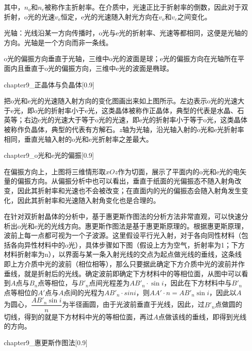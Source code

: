 其中，$n_o$和$n_e$被称作主折射率。在介质中，光速正比于折射率的倒数，因此对于双折射，o光的光速$v_o$恒定，e光的光速随入射光方向在$v_o$和$v_e$之间变化。
\begin{law}[光轴、o光与e光的偏振方向]
    光轴：光线沿某一方向传播时，o光与e光的折射率、光速等都相同，这便是光轴的方向。光轴是一个方向而非一条线。

    o光的偏振方向垂直于光轴，三维中o光的波面是球；e光的偏振方向在光轴所在平面内且垂直于o光的偏振方向，三维中e光的波面是椭球。
\end{law}
\begin{singlefigure}[正晶体与负晶体]{chapter9_正晶体与负晶体}[0.9]
\end{singlefigure}

把o光和e光的光速随入射方向的变化图画出来如上图所示。左边表示o光的光速大于e光，即o光的折射率小于e光，这类晶体被称作正晶体，典型的代表是水晶、石英等；右边e光的光速大于等于o光的光速，即e光的折射率小于等于o光，这类晶体被称作负晶体，典型的代表有方解石。$z$轴为光轴，沿光轴入射的o光和e光折射率相同，垂直光轴入射的o光和e光折射率之差最大。

\begin{singlefigure}[o光和e光的偏振]{chapter9_o光和e光的偏振}[0.9]
\end{singlefigure}

在偏振方向上，上图将三维情形取$xOz$作为切面，展示了平面内的o光和e光的电矢量的偏振方向。从偏振分析中也可以看出，垂直于纸面的光偏振态不随入射角改变，因此其折射率和光速也不会被改变；在直面内的光的偏振态会随入射角发生变化，因此其折射率和光速随入射角变化也是合理的。

在针对双折射晶体的分析中，基于惠更斯作图法的分析方法非常直观，可以快速分析出o光和e光的光线方向。惠更斯作图法是基于惠更斯原理的。根据惠更斯原理，波前上每一点都可视为一个子波源。这里假设平行光入射，对于各向同性材料（包括各向异性材料中的o光），具体步骤如下图（假设上方为空气，折射率为1；下方材料折射率为n），以界面与某一条入射光线的交点为起点做光线的垂线，这条线即上方介质中光的波前（相位相等），那么只要据此确定下方介质中光的波前并作垂线，就是折射后的光线。确定波前即确定下方材料中的等相位面，从图中可以看到$A$点与$B_n$点等相位，与$B'_n$点间光程差为$AB'_n\cdot \sin i$，因此在下方材料中与$B'_n$点等相位的$A'$点与$A$点间的光程为$AB'_n\cdot sini$，则$AA'\cdot n=AB'_n\sin i$，因此以$A$为圆心，$\dfrac{AB'_n \sin i}{n}$为半径画圆，由于光波前垂直于光线，因此，过$B'_n$点做圆的切线，得到的就是下方材料中光的等相位面，再过$A$点做该线的垂线，即得到光线的方向。
\begin{singlefigure}[惠更斯作图法]{chapter9_惠更斯作图法}[0.9]
\end{singlefigure}

